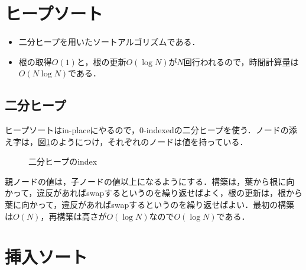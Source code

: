 \documentclass[slide,20pt]{ltjsarticle}
\begin{document}
\section{ヒープソート}

\begin{itemize}
  \item 二分ヒープを用いたソートアルゴリズムである．
  \item 根の取得$O(1)$と，根の更新$O(\log N)$が$N$回行われるので，時間計算量は$O(N \log N)$である．
\end{itemize}

\subsection{二分ヒープ}

ヒープソートはin-placeにやるので，0-indexedの二分ヒープを使う．ノードの添え字は，図\ref{fig:heap}のようにつけ，それぞれのノードは値を持っている．

\begin{figure}[h]
  \centering
  \caption{二分ヒープのindex}
  \label{fig:heap}
\end{figure}

親ノードの値は，子ノードの値以上になるようにする．構築は，葉から根に向かって，違反があればswapするというのを繰り返せばよく，根の更新は，根から葉に向かって，違反があればswapするというのを繰り返せばよい．最初の構築は$O(N)$，再構築は高さが$O(\log N)$なので$O(\log N)$である．

\section{挿入ソート}
\end{document}
